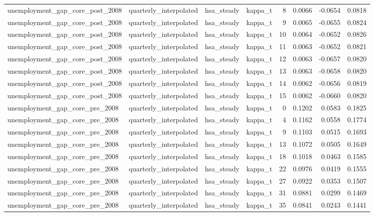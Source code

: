 \begin{tabular}{llllrrrr}
unemployment\_gap\_core\_post\_2008 & quarterly\_interpolated & hsa\_steady & kappa\_t & 8 & 0.0066 & -0.0654 & 0.0818 \\
unemployment\_gap\_core\_post\_2008 & quarterly\_interpolated & hsa\_steady & kappa\_t & 9 & 0.0065 & -0.0655 & 0.0824 \\
unemployment\_gap\_core\_post\_2008 & quarterly\_interpolated & hsa\_steady & kappa\_t & 10 & 0.0064 & -0.0652 & 0.0826 \\
unemployment\_gap\_core\_post\_2008 & quarterly\_interpolated & hsa\_steady & kappa\_t & 11 & 0.0063 & -0.0652 & 0.0821 \\
unemployment\_gap\_core\_post\_2008 & quarterly\_interpolated & hsa\_steady & kappa\_t & 12 & 0.0063 & -0.0657 & 0.0820 \\
unemployment\_gap\_core\_post\_2008 & quarterly\_interpolated & hsa\_steady & kappa\_t & 13 & 0.0063 & -0.0658 & 0.0820 \\
unemployment\_gap\_core\_post\_2008 & quarterly\_interpolated & hsa\_steady & kappa\_t & 14 & 0.0062 & -0.0656 & 0.0819 \\
unemployment\_gap\_core\_post\_2008 & quarterly\_interpolated & hsa\_steady & kappa\_t & 15 & 0.0062 & -0.0660 & 0.0820 \\
unemployment\_gap\_core\_pre\_2008 & quarterly\_interpolated & hsa\_steady & kappa\_t & 0 & 0.1202 & 0.0583 & 0.1825 \\
unemployment\_gap\_core\_pre\_2008 & quarterly\_interpolated & hsa\_steady & kappa\_t & 4 & 0.1162 & 0.0558 & 0.1774 \\
unemployment\_gap\_core\_pre\_2008 & quarterly\_interpolated & hsa\_steady & kappa\_t & 9 & 0.1103 & 0.0515 & 0.1693 \\
unemployment\_gap\_core\_pre\_2008 & quarterly\_interpolated & hsa\_steady & kappa\_t & 13 & 0.1072 & 0.0505 & 0.1649 \\
unemployment\_gap\_core\_pre\_2008 & quarterly\_interpolated & hsa\_steady & kappa\_t & 18 & 0.1018 & 0.0463 & 0.1585 \\
unemployment\_gap\_core\_pre\_2008 & quarterly\_interpolated & hsa\_steady & kappa\_t & 22 & 0.0976 & 0.0419 & 0.1555 \\
unemployment\_gap\_core\_pre\_2008 & quarterly\_interpolated & hsa\_steady & kappa\_t & 27 & 0.0922 & 0.0353 & 0.1507 \\
unemployment\_gap\_core\_pre\_2008 & quarterly\_interpolated & hsa\_steady & kappa\_t & 31 & 0.0881 & 0.0299 & 0.1469 \\
unemployment\_gap\_core\_pre\_2008 & quarterly\_interpolated & hsa\_steady & kappa\_t & 35 & 0.0841 & 0.0243 & 0.1441 \\

\end{tabular}
